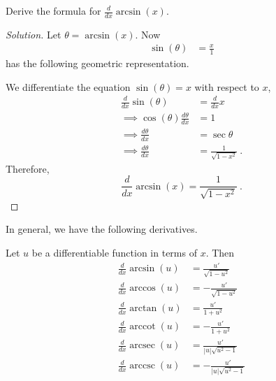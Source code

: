 \documentclass[compacto,10pt,comentarios]{aleph-notas}
\DeclareMathOperator{\arccot}{arccot}
\DeclareMathOperator{\arcsec}{arcsec}
\DeclareMathOperator{\arccsc}{arccsc}
\begin{document}
\begin{ejer}
    Derive the formula for $\frac{d}{dx} \arcsin(x)$.
\end{ejer}
\begin{proof}[Solution]
    Let $\theta = \arcsin(x)$. Now
    \begin{align*}
        \sin\left(\theta\right) & = \frac{x}{1}
    \end{align*}
    has the following geometric representation.
    \begin{center}
    \end{center}
    We differentiate the equation $\sin(\theta) = x$ with respect to $x$,
    \begin{align*}
    \frac{d}{dx} \sin(\theta) & = \frac{d}{dx} x \\
    \implies \cos(\theta) \frac{d\theta}{dx} & = 1 \\
    \implies \frac{d\theta}{dx} & = \sec{\theta} \\
    \implies \frac{d\theta}{dx} & = \frac{1}{\sqrt{1-x^2}} ~ .
    \end{align*}
    Therefore,
    $$
    \frac{d}{dx} \arcsin(x) = \frac{1}{\sqrt{1-x^2}} ~ .
    $$
\end{proof}

In general, we have the following derivatives.
\begin{defi}
    Let $u$ be a differentiable function in terms of $x$. Then
    \begin{align*}
        \frac{d}{dx} \arcsin(u) & = \frac{u'}{\sqrt{1 - u^2}} \\
        \frac{d}{dx} \arccos(u) & = -\frac{u'}{\sqrt{1 - u^2}} \\
        \frac{d}{dx} \arctan(u) & = \frac{u'}{1 + u^2} \\
        \frac{d}{dx} \arccot(u) & = -\frac{u'}{1 + u^2} \\
        \frac{d}{dx} \arcsec(u) & = \frac{u'}{|u| \sqrt{u^2 - 1}} \\
        \frac{d}{dx} \arccsc(u) & = -\frac{u'}{|u| \sqrt{u^2 - 1}}
    \end{align*}
\end{defi}
\end{document}
